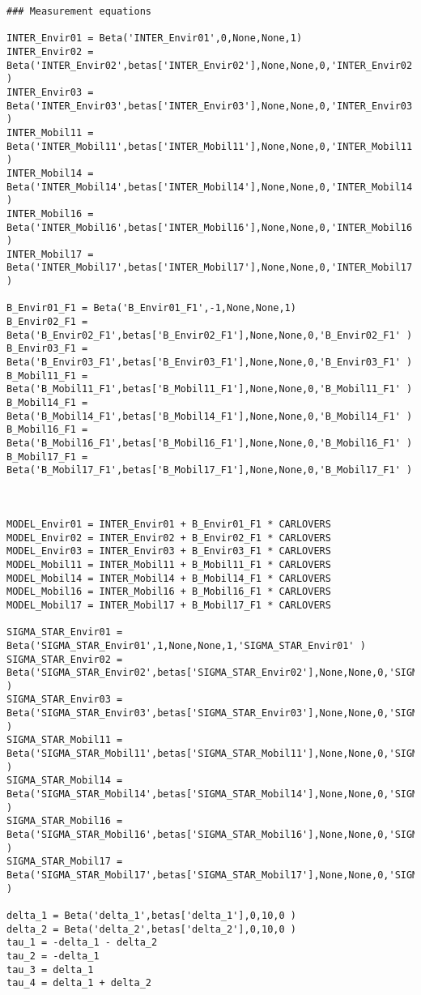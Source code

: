 \documentclass[12pt,a4paper]{article}
\begin{document}
\begin{lstlisting}[style=numbers]
### Measurement equations

INTER_Envir01 = Beta('INTER_Envir01',0,None,None,1)
INTER_Envir02 = Beta('INTER_Envir02',betas['INTER_Envir02'],None,None,0,'INTER_Envir02' )
INTER_Envir03 = Beta('INTER_Envir03',betas['INTER_Envir03'],None,None,0,'INTER_Envir03' )
INTER_Mobil11 = Beta('INTER_Mobil11',betas['INTER_Mobil11'],None,None,0,'INTER_Mobil11' )
INTER_Mobil14 = Beta('INTER_Mobil14',betas['INTER_Mobil14'],None,None,0,'INTER_Mobil14' )
INTER_Mobil16 = Beta('INTER_Mobil16',betas['INTER_Mobil16'],None,None,0,'INTER_Mobil16' )
INTER_Mobil17 = Beta('INTER_Mobil17',betas['INTER_Mobil17'],None,None,0,'INTER_Mobil17' )

B_Envir01_F1 = Beta('B_Envir01_F1',-1,None,None,1)
B_Envir02_F1 = Beta('B_Envir02_F1',betas['B_Envir02_F1'],None,None,0,'B_Envir02_F1' )
B_Envir03_F1 = Beta('B_Envir03_F1',betas['B_Envir03_F1'],None,None,0,'B_Envir03_F1' )
B_Mobil11_F1 = Beta('B_Mobil11_F1',betas['B_Mobil11_F1'],None,None,0,'B_Mobil11_F1' )
B_Mobil14_F1 = Beta('B_Mobil14_F1',betas['B_Mobil14_F1'],None,None,0,'B_Mobil14_F1' )
B_Mobil16_F1 = Beta('B_Mobil16_F1',betas['B_Mobil16_F1'],None,None,0,'B_Mobil16_F1' )
B_Mobil17_F1 = Beta('B_Mobil17_F1',betas['B_Mobil17_F1'],None,None,0,'B_Mobil17_F1' )



MODEL_Envir01 = INTER_Envir01 + B_Envir01_F1 * CARLOVERS
MODEL_Envir02 = INTER_Envir02 + B_Envir02_F1 * CARLOVERS
MODEL_Envir03 = INTER_Envir03 + B_Envir03_F1 * CARLOVERS
MODEL_Mobil11 = INTER_Mobil11 + B_Mobil11_F1 * CARLOVERS
MODEL_Mobil14 = INTER_Mobil14 + B_Mobil14_F1 * CARLOVERS
MODEL_Mobil16 = INTER_Mobil16 + B_Mobil16_F1 * CARLOVERS
MODEL_Mobil17 = INTER_Mobil17 + B_Mobil17_F1 * CARLOVERS

SIGMA_STAR_Envir01 = Beta('SIGMA_STAR_Envir01',1,None,None,1,'SIGMA_STAR_Envir01' )
SIGMA_STAR_Envir02 = Beta('SIGMA_STAR_Envir02',betas['SIGMA_STAR_Envir02'],None,None,0,'SIGMA_STAR_Envir02' )
SIGMA_STAR_Envir03 = Beta('SIGMA_STAR_Envir03',betas['SIGMA_STAR_Envir03'],None,None,0,'SIGMA_STAR_Envir03' )
SIGMA_STAR_Mobil11 = Beta('SIGMA_STAR_Mobil11',betas['SIGMA_STAR_Mobil11'],None,None,0,'SIGMA_STAR_Mobil11' )
SIGMA_STAR_Mobil14 = Beta('SIGMA_STAR_Mobil14',betas['SIGMA_STAR_Mobil14'],None,None,0,'SIGMA_STAR_Mobil14' )
SIGMA_STAR_Mobil16 = Beta('SIGMA_STAR_Mobil16',betas['SIGMA_STAR_Mobil16'],None,None,0,'SIGMA_STAR_Mobil16' )
SIGMA_STAR_Mobil17 = Beta('SIGMA_STAR_Mobil17',betas['SIGMA_STAR_Mobil17'],None,None,0,'SIGMA_STAR_Mobil17' )

delta_1 = Beta('delta_1',betas['delta_1'],0,10,0 )
delta_2 = Beta('delta_2',betas['delta_2'],0,10,0 )
tau_1 = -delta_1 - delta_2
tau_2 = -delta_1 
tau_3 = delta_1
tau_4 = delta_1 + delta_2


\end{lstlisting}
\end{document}
